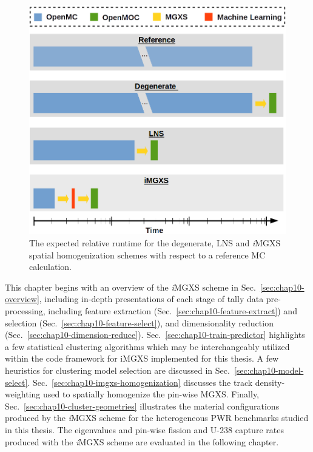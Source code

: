 \begin{figure}[h!]
\centering
\includegraphics[width=0.6\linewidth]{figures/unsupervised/flow-chart}
\vspace{2mm}
\caption[Expected relative runtimes for different homogenization schemes]{The expected relative runtime for the degenerate, \ac{LNS} and \textit{i}\ac{MGXS} spatial homogenization schemes with respect to a reference \ac{MC} calculation.}
\label{fig:chap10-flow-chart}
\end{figure}


This chapter begins with an overview of the \textit{i}\ac{MGXS} scheme in Sec.~\ref{sec:chap10-overview}, including in-depth presentations of each stage of tally data pre-processing, including feature extraction (Sec.~\ref{sec:chap10-feature-extract}) and selection (Sec.~\ref{sec:chap10-feature-select}), and dimensionality reduction (Sec.~\ref{sec:chap10-dimension-reduce}). Sec.~\ref{sec:chap10-train-predictor} highlights a few statistical clustering algorithms which may be interchangeably utilized within the code framework for i\ac{MGXS} implemented for this thesis. A few heuristics for clustering model selection are discussed in Sec.~\ref{sec:chap10-model-select}. Sec.~\ref{sec:chap10-imgxs-homogenization} discusses the track density-weighting used to spatially homogenize the pin-wise \ac{MGXS}. Finally, Sec.~\ref{sec:chap10-cluster-geometries} illustrates the material configurations produced by the \textit{i}\ac{MGXS} scheme for the heterogeneous \ac{PWR} benchmarks studied in this thesis. The eigenvalues and pin-wise fission and U-238 capture rates produced with the \textit{i}\ac{MGXS} scheme are evaluated in the following chapter.


